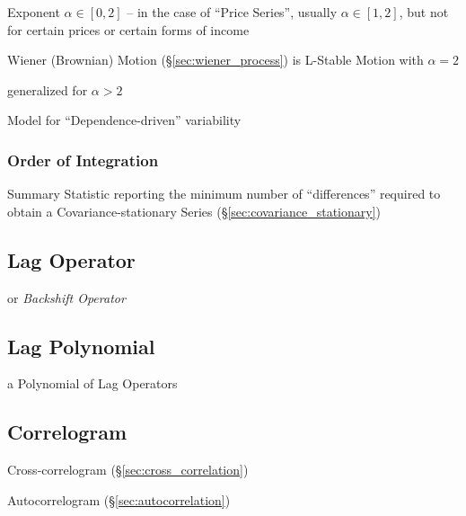 Exponent $\alpha \in [0, 2]$ -- in the case of ``Price Series'', usually
$\alpha \in [1, 2]$, but not for certain prices or certain forms of income

Wiener (Brownian) Motion (\S\ref{sec:wiener_process}) is L-Stable Motion with
$\alpha = 2$

generalized for $\alpha > 2$

Model for ``Dependence-driven'' variability



\subsubsection{Order of Integration}\label{sec:order_of_integration}

Summary Statistic reporting the minimum number of ``differences'' required to
obtain a Covariance-stationary Series (\S\ref{sec:covariance_stationary})



\subsection{Lag Operator}\label{sec:lag_operator}

or \emph{Backshift Operator}



\subsection{Lag Polynomial}\label{sec:lag_polynomial}

a Polynomial of Lag Operators



\subsection{Correlogram}\label{sec:correlogram}

Cross-correlogram (\S\ref{sec:cross_correlation})

Autocorrelogram (\S\ref{sec:autocorrelation})



